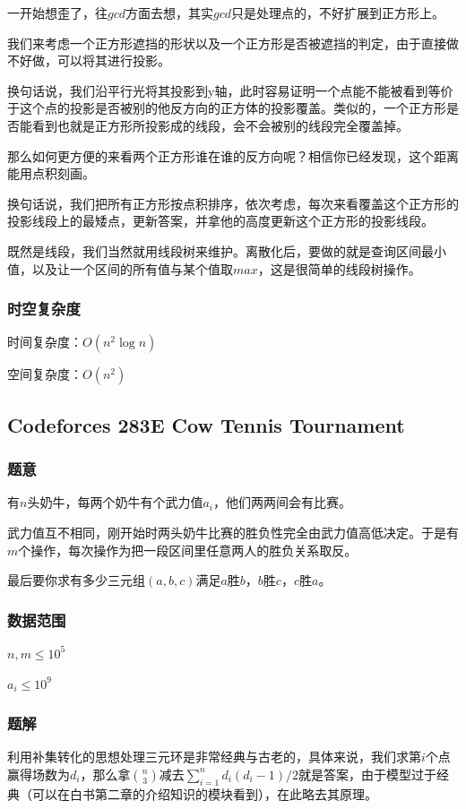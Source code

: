 \documentclass{ctexart}
\begin{document}
一开始想歪了，往$gcd$方面去想，其实$gcd$只是处理点的，不好扩展到正方形上。

我们来考虑一个正方形遮挡的形状以及一个正方形是否被遮挡的判定，由于直接做不好做，可以将其进行投影。

换句话说，我们沿平行光将其投影到y轴，此时容易证明一个点能不能被看到等价于这个点的投影是否被别的他反方向的正方体的投影覆盖。类似的，一个正方形是否能看到也就是正方形所投影成的线段，会不会被别的线段完全覆盖掉。

那么如何更方便的来看两个正方形谁在谁的反方向呢？相信你已经发现，这个距离能用点积刻画。

换句话说，我们把所有正方形按点积排序，依次考虑，每次来看覆盖这个正方形的投影线段上的最矮点，更新答案，并拿他的高度更新这个正方形的投影线段。

既然是线段，我们当然就用线段树来维护。离散化后，要做的就是查询区间最小值，以及让一个区间的所有值与某个值取$max$，这是很简单的线段树操作。
\subsubsection{时空复杂度}
时间复杂度：$O(n^2 \log n)$

空间复杂度：$O(n^2)$
\subsection{Codeforces 283E Cow Tennis Tournament}
\subsubsection{题意}
有$n$头奶牛，每两个奶牛有个武力值$a_i$，他们两两间会有比赛。

武力值互不相同，刚开始时两头奶牛比赛的胜负性完全由武力值高低决定。于是有$m$个操作，每次操作为把一段区间里任意两人的胜负关系取反。

最后要你求有多少三元组$(a,b,c)$满足$a$胜$b$，$b$胜$c$，$c$胜$a$。
\subsubsection{数据范围}
$n,m \le 10^5$

$a_i \le 10^9$
\subsubsection{题解}
利用补集转化的思想处理三元环是非常经典与古老的，具体来说，我们求第$i$个点赢得场数为$d_i$，那么拿${n \choose 3}$减去$\sum\limits_{i=1}^n d_i(d_i-1)/2$就是答案，由于模型过于经典（可以在白书第二章的介绍知识的模块看到），在此略去其原理。
\end{document}
